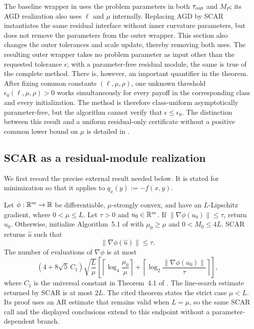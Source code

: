 \documentclass{article}
\begin{document}
The baseline wrapper in  uses the problem parameters
in both $\tau_{\rm out}$ and $M_P$; its AGD realization also uses
$\ell$ and $\mu$ internally.  Replacing AGD by SCAR instantiates the
same residual interface without inner curvature parameters, but does
not remove the parameters from the outer wrapper.  This section also
changes the outer tolerances and scale update, thereby removing both
uses.  The resulting outer wrapper takes no problem parameter as input
other than the requested tolerance $\epsilon$; with a parameter-free
residual module, the same is true of the complete method.
There is, however, an important quantifier in the theorem.  After
fixing common constants $(\ell,\mu,\rho)$, one unknown threshold
$\epsilon_0(\ell,\mu,\rho)>0$ works simultaneously for every payoff
in the corresponding class and every initialization.  The method is
therefore class-uniform asymptotically parameter-free, but the
algorithm cannot verify that $\epsilon\le\epsilon_0$.  The distinction
between this result and a uniform residual-only certificate without a
positive common lower bound on $\mu$ is detailed in
.

\subsection{SCAR as a residual-module realization}

We first record the precise external result needed below.  It is stated
for minimization so that it applies to
$q_x(y):=-f(x,y)$.

\begin{theorem}
\label{thm:scar-blackbox}
Let $\phi:\mathbb{R}^m\to\mathbb{R}$ be differentiable, $\mu$-strongly convex, and
have an $L$-Lipschitz gradient, where $0<\mu\le L$.  Let $\tau>0$ and
$u_0\in\mathbb{R}^m$.  If $\|\nabla\phi(u_0)\|\le\tau$, return $u_0$.
Otherwise, initialize Algorithm~5.1 of \citet{lan2026optimal} with
$\mu_0\ge\mu$ and $0<M_0\le4L$.  SCAR returns $\widehat u$ such that
\begin{equation}\label{eq:scar-residual}
 \|\nabla\phi(\widehat u)\|\le\tau.
\end{equation}
The number of evaluations of $\nabla\phi$ is at most
\begin{equation}\label{eq:scar-original-complexity}
 (4+8\sqrt5\,C_1)\sqrt{\frac L\mu}
 \left[
  \left\lceil\log_4\frac{\mu_0}{\mu}\right\rceil
  +\left\lceil
    \log_2\frac{\|\nabla\phi(u_0)\|}{\tau}
   \right\rceil
 \right],
\end{equation}
where $C_1$ is the universal constant in Theorem~4.1 of
\citet{lan2026optimal}.  The line-search estimate returned by SCAR is
at most $2L$.
The cited theorem states the strict case $\mu<L$.  Its proof uses an
AR estimate that remains valid when $L=\mu$, so the same SCAR call and
the displayed conclusions extend to this endpoint without a
parameter-dependent branch.
\end{theorem}
\end{document}
